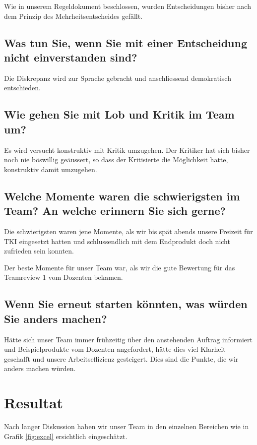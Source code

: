 Wie in unserem Regeldokument beschlossen, wurden Entscheidungen bisher nach dem Prinzip des Mehrheitsentscheides gefällt.

\subsection*{Was tun Sie, wenn Sie mit einer Entscheidung nicht einverstanden sind?}

Die Diskrepanz wird zur Sprache gebracht und anschliessend demokratisch entschieden.

\subsection*{Wie gehen Sie mit Lob und Kritik im Team um?}

Es wird versucht konstruktiv mit Kritik umzugehen. Der Kritiker hat sich bisher noch nie böswillig geäussert, so dass der Kritisierte die Möglichkeit hatte, konstruktiv damit umzugehen. 

\subsection*{Welche Momente waren die schwierigsten im Team? An welche erinnern Sie sich
gerne?}

Die schwierigsten waren jene Momente, als wir bis spät abends unsere Freizeit für TKI eingesetzt hatten und schlussendlich mit dem Endprodukt doch nicht zufrieden sein konnten. 

Der beste Momente für unser Team war, als wir die gute Bewertung für das Teamreview 1 vom Dozenten bekamen.  

\subsection*{Wenn Sie erneut starten könnten, was würden Sie anders machen?}

Hätte sich unser Team immer frühzeitig über den anstehenden Auftrag informiert und Beispielprodukte vom Dozenten angefordert, hätte dies viel Klarheit geschafft und unsere Arbeitseffizienz gesteigert. Dies sind die Punkte, die wir anders machen würden. 

\section{Resultat}

Nach langer Diskussion haben wir unser Team in den einzelnen Bereichen wie in Grafik \ref{fig:excel} ersichtlich eingeschätzt.

